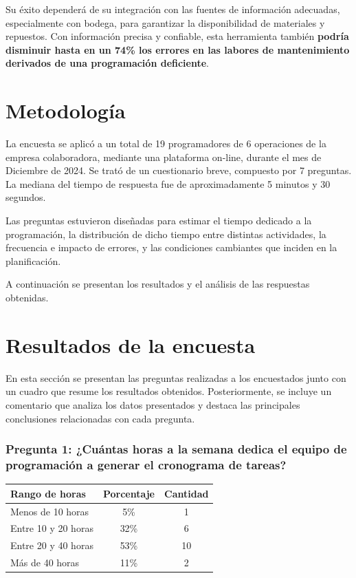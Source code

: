 \documentclass{article}
\begin{document}
\begin{appendix}
    Su éxito dependerá de su integración con las fuentes de información adecuadas, especialmente con bodega, para garantizar la disponibilidad de materiales y repuestos. Con información precisa y confiable, esta herramienta también \textbf{podría disminuir hasta en un 74\% los errores en las labores de mantenimiento derivados de una programación deficiente}.
    
    \section*{Metodología}
    
    La encuesta se aplicó a un total de 19 programadores de 6 operaciones de la empresa colaboradora, mediante una plataforma on-line, durante el mes de Diciembre de 2024. Se trató de un cuestionario breve, compuesto por 7 preguntas. La mediana del tiempo de respuesta fue de aproximadamente 5 minutos y 30 segundos. 
    
    Las preguntas estuvieron diseñadas para estimar el tiempo dedicado a la programación, la distribución de dicho tiempo entre distintas actividades, la frecuencia e impacto de errores, y las condiciones cambiantes que inciden en la planificación.
    
    A continuación se presentan los resultados y el análisis de las respuestas obtenidas.
    
    \section*{Resultados de la encuesta}
    
    En esta sección se presentan las preguntas realizadas a los encuestados junto con un cuadro que resume los resultados obtenidos. Posteriormente, se incluye un comentario que analiza los datos presentados y destaca las principales conclusiones relacionadas con cada pregunta.
    
    \vspace{.5em}
    \subsubsection*{Pregunta 1: ¿Cuántas horas a la semana dedica el equipo de programación a generar el cronograma de tareas?}
    
    
    
    \begin{table}[htbp]
        \centering
        \begin{tabular}{lcc}
            \toprule
            \textbf{Rango de horas} & \textbf{Porcentaje} & \textbf{Cantidad} \\
            \midrule
            Menos de 10 horas & 5\% & 1 \\
            Entre 10 y 20 horas & 32\% & 6 \\
            Entre 20 y 40 horas & 53\% & 10 \\
            Más de 40 horas & 11\% & 2 \\
            \bottomrule
        \end{tabular}
        \label{tab:horas_semanales}
    \end{table}
    

\end{appendix}
\end{document}

